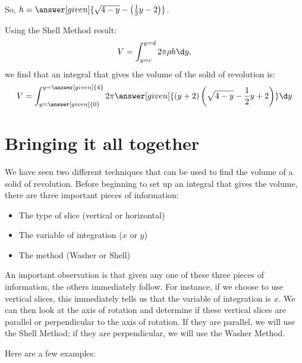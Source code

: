 \documentclass{ximera}
\begin{document}
\begin{example}
\begin{multipleChoice}
\end{multipleChoice}   

So, $h= \answer[given]{ \sqrt{4-y} - \left(\frac{1}{2}y-2\right)}$.


Using the Shell Method result: \[V = \int_{y=c}^{y=d} 2\pi \rho h \d y, \] we find that an integral that gives the volume of the solid of revolution is:            
	\[
	V= \int_{y=\answer[given]{0}}^{y=\answer[given]{4}} 2 \pi \answer[given]{(y+2)\left( \sqrt{4-y} - \frac{1}{2}y +2 \right)}\d y
	\]

\end{example}


\section{Bringing it all together}
We have seen two different techniques that can be used to find the volume of a solid of revolution.  Before beginning to set up an integral that gives the volume, there are three important pieces of information:

\begin{itemize}
\item The type of slice (vertical or horizontal)
\item The variable of integration ($x$ or $y$)
\item The method (Washer or Shell)
\end{itemize}

An important observation is that given any one of these three pieces of information, the others immediately follow.  For instance, if we choose to use vertical slices, this immediately tells us that the variable of integration is $x$.  We can then look at the axis of rotation and determine if these vertical slices are parallel or perpendicular to the axis of rotation.  If they are parallel, we will use the Shell Method; if they are perpendicular, we will use the Washer Method.

Here are a few examples:
\end{document}
